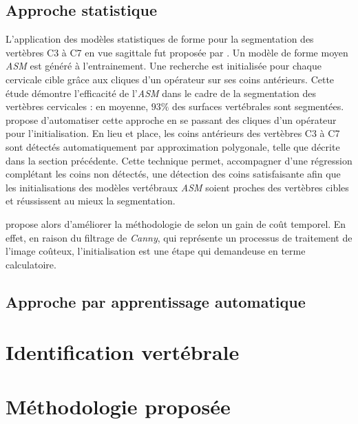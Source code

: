     \subsection{Approche statistique}

        L'application des modèles statistiques de forme pour la segmentation des vertèbres C3 à C7 en vue sagittale fut proposée par \cite{Benjelloun2010}. Un modèle de forme moyen {\itshape ASM} est généré à l'entrainement. Une recherche est initialisée pour chaque cervicale cible grâce aux cliques d'un opérateur sur ses coins antérieurs. Cette étude démontre l'efficacité de l'{\itshape ASM} dans le cadre de la segmentation des vertèbres cervicales : en moyenne, $93\%$ des surfaces vertébrales sont segmentées.
        \\

        \cite{Lecron2010} propose d'automatiser cette approche en se passant des cliques d'un opérateur pour l'initialisation. En lieu et place, les coins antérieurs des vertèbres C3 à C7 sont détectés automatiquement par approximation polygonale, telle que décrite dans la section précédente. Cette technique permet, accompagner d'une régression complétant les coins non détectés, une détection des coins satisfaisante afin que les initialisations des modèles vertébraux {\itshape ASM} soient proches des vertèbres cibles et réussissent au mieux la segmentation.

        \cite{Mahmoudi2010} propose alors d'améliorer la méthodologie de \cite{Lecron2010} selon un gain de coût temporel. En effet, en raison du filtrage de {\itshape Canny}, qui représente un processus de traitement de l'image coûteux, l'initialisation est une étape qui demandeuse en terme calculatoire.



    \subsection{Approche par apprentissage automatique}

\section{Identification vertébrale}

\section{Méthodologie proposée}
